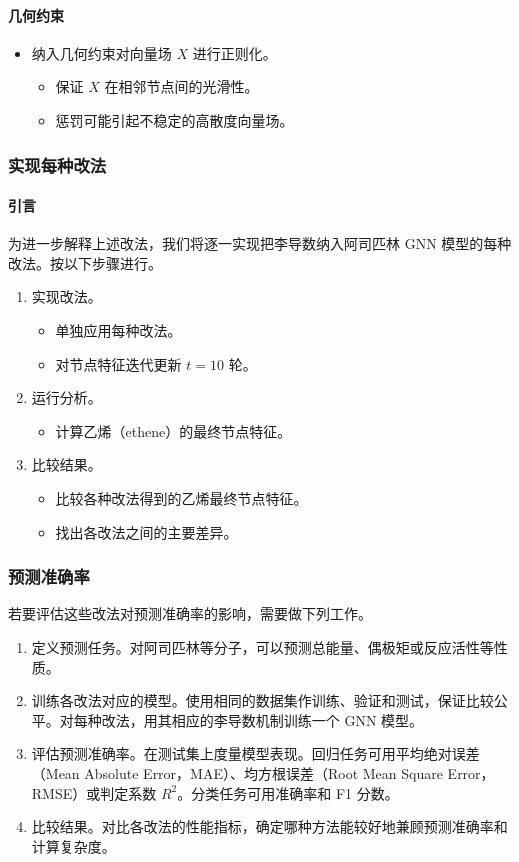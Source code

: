 \paragraph{几何约束}
\begin{itemize}
  \item 纳入几何约束对向量场 $X$ 进行正则化。
  \begin{itemize}
    \item 保证 $X$ 在相邻节点间的光滑性。
    \item 惩罚可能引起不稳定的高散度向量场。
  \end{itemize}
\end{itemize}

\subsubsection{实现每种改法}
\paragraph{引言}
为进一步解释上述改法，我们将逐一实现把李导数纳入阿司匹林 GNN 模型的每种改法。按以下步骤进行。
\begin{enumerate}
  \item 实现改法。
  \begin{itemize}
    \item 单独应用每种改法。
    \item 对节点特征迭代更新 $t=10$ 轮。
  \end{itemize}
  \item 运行分析。
  \begin{itemize}
    \item 计算乙烯（ethene）的最终节点特征。
  \end{itemize}
  \item 比较结果。
  \begin{itemize}
    \item 比较各种改法得到的乙烯最终节点特征。
    \item 找出各改法之间的主要差异。
  \end{itemize}
\end{enumerate}

\subsubsection{预测准确率}
若要评估这些改法对预测准确率的影响，需要做下列工作。
\begin{enumerate}
  \item 定义预测任务。对阿司匹林等分子，可以预测总能量、偶极矩或反应活性等性质。
  \item 训练各改法对应的模型。使用相同的数据集作训练、验证和测试，保证比较公平。对每种改法，用其相应的李导数机制训练一个 GNN 模型。
  \item 评估预测准确率。在测试集上度量模型表现。回归任务可用平均绝对误差（Mean Absolute Error，MAE）、均方根误差（Root Mean Square Error，RMSE）或判定系数 $R^2$。分类任务可用准确率和 F1 分数。
  \item 比较结果。对比各改法的性能指标，确定哪种方法能较好地兼顾预测准确率和计算复杂度。
\end{enumerate}

